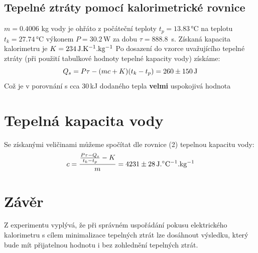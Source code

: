 \documentclass[czech,11pt,a4paper]{article}
\begin{document}
	
	
	  
  \subsection{Tepelné ztráty pomocí kalorimetrické rovnice}

	$m = 0.4006$ kg vody je ohřáto z počáteční teploty $t_p = 13.83\,$°C na teplotu $t_k = 27.74\, $°C výkonem $P = 30.2\,$W za dobu $\tau = 888.8\,$ s. Získaná kapacita kalorimetru je $K = 234\,\rm J.K^{-1}.kg^{-1}$
	Po dosazení do vzorce uvažujícího tepelné ztráty (při použití tabulkové hodnoty tepelné kapacity vody) získáme:
	\begin{equation}
		Q_s = P \tau - (mc + K)(t_k - t_p) = 260 \pm 150 \,\rm J
	\end{equation}
	Což je v porovnání s cca $30 \,$kJ dodaného tepla \textbf{velmi} uspokojivá hodnota
	

	\section{Tepelná kapacita vody}
	Se získanými veličinami můžeme spočítat dle rovnice (2) tepelnou kapacitu vody:
	\begin{equation}
		c = \frac{\frac{P \tau - Q_s}{t_k - t_p} - K}m = 4231 \pm 28 \,\rm J. ^\circ C ^{-1}.kg^{-1}
	\end{equation}
	
	
	\section{Závěr}
	Z experimentu vyplývá, že při správném uspořádání pokusu elektrického kalorimetru s cílem minimalizace tepelných ztrát lze dosáhnout výsledku, který bude mít přijatelnou hodnotu i bez zohlednění tepelných ztrát.
	
	
	
\end{document}
